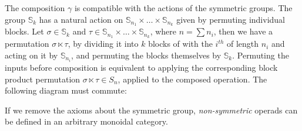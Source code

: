 \documentclass{tac}
\def\id{\operatorname{id}}
\renewcommand{\S}{{\mathbb S}}
\begin{document}
\begin{definition}
\begin{description}
\begin{center}
\begin{tikzcd}[column sep=large, row sep=large]
    \end{tikzcd}
    \end{center}
    \begin{center}
    \end{center}
    
    \item[Equivariance] 
    
    The composition $\gamma$ is compatible with the actions of the symmetric groups.  The group $\mathbb S_k$ has a natural action on  $\mathbb S_{n_1} \times \dots \times \mathbb S_{n_k}$ given by permuting individual blocks. Let $\sigma \in \mathbb S_k$ and $\tau \in \mathbb S_{n_1} \times \dots \times \mathbb S_{n_k}$, where $n = \sum n_i$, then we have a permutation $\sigma \ltimes \tau$, by dividing it into $k$ blocks of with the $i^{th}$ of length $n_i$ and acting on it by $\S_{n_i}$, and permuting the blocks themselves by $\S_k$. Permuting the inputs before composition is equivalent to applying the corresponding block product permutation $\sigma \ltimes \tau \in S_n$, applied to the composed operation.  The following diagram must commute:
    \begin{center}
    \end{center}
\end{description}
\end{definition}
\begin{remark}
    If we remove the axioms about the symmetric group, \emph{non-symmetric} operads can be defined in an arbitrary monoidal category. 
\end{remark}
\end{document}
